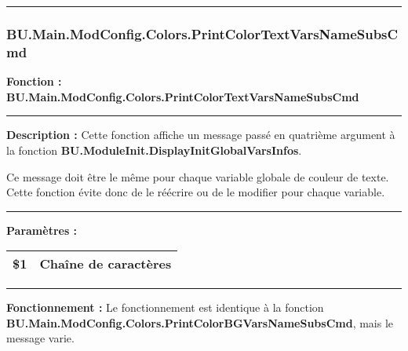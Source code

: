 \documentclass[a4paper,10pt]{article}
\begin{document}


\color{sec3}\par\noindent\rule{\textwidth}{0.4pt}\color{text}

\color{sec3}
\subsubsection{BU.Main.ModConfig.Colors.PrintColorTextVarsNameSubsCmd}\color{text}

\begin{justify}
    \textbf{Fonction : \color{func}BU.Main.ModConfig.Colors.PrintColorTextVarsNameSubsCmd}
\end{justify}


\par\noindent\rule{\textwidth}{0.4pt}

\begin{justify}
    \textbf{Description :} Cette fonction affiche un message passé en quatrième argument à la fonction \textbf{\color{func}BU.ModuleInit.DisplayInitGlobalVarsInfos}.
\end{justify}

\begin{justify}
    Ce message doit être le même pour chaque variable globale de couleur de texte. Cette fonction évite donc de le réécrire ou de le modifier pour chaque variable.
\end{justify}


\par\noindent\rule{\textwidth}{0.4pt}

\begin{justify}
    \textbf{Paramètres :}

    \begin{tabular}{|l|l|}
        \hline
        \textbf{\color{vars}\$1} & Chaîne de caractères\\
        \hline
    \end{tabular}
\end{justify}


\par\noindent\rule{\textwidth}{0.4pt}

\begin{justify}
    \textbf{Fonctionnement :} Le fonctionnement est identique à la fonction \textbf{\color{func}BU.Main.ModConfig.Colors.PrintColorBGVarsNameSubsCmd}, mais le message varie.
\end{justify}
\end{document}
